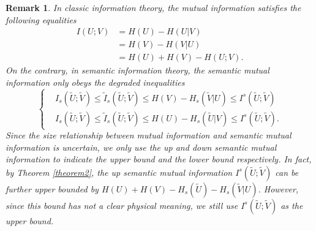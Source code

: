 \documentclass[12pt, draftclsnofoot,onecolumn]{IEEEtran}
\newtheorem{remark}{\bf{Remark}}
\begin{document}
\begin{remark}
In classic information theory, the mutual information satisfies the following equalities
\begin{equation}
\begin{aligned}
I(U;V)&=H(U)-H(U|V)\\
         &=H(V)-H(V|U)\\
         &=H(U)+H(V)-H(U;V).
\end{aligned}
\end{equation}
On the contrary, in semantic information theory, the semantic mutual information only obeys the degraded inequalities
\begin{equation}
\left\{\begin{aligned}
&I_s (\tilde{U};\tilde{V}) \leq \tilde{I}_s (\tilde{U};\tilde{V} ) \leq H(V)-H_s(\tilde{V}\left|U\right.) \leq I^s (\tilde{U};\tilde{V})\\
&I_s (\tilde{U};\tilde{V} ) \leq \tilde{I}_s (\tilde{U};\tilde{V}) \leq H(U)-H_s(\tilde{U}\left|V\right.) \leq I^s (\tilde{U};\tilde{V}).
\end{aligned}\right.
\end{equation}
Since the size relationship between mutual information and semantic mutual information is uncertain, we only use the up and down semantic mutual information to indicate the upper bound and the lower bound respectively. In fact, by Theorem \ref{theorem2}, the up semantic mutual information $I^s(\tilde{U};\tilde{V})$ can be further upper bounded by $H(U)+H(V)-H_s(\tilde{U})-H_s(\tilde{V}\left|U\right.)$. However, since this bound has not a clear physical meaning, we still use $I^s(\tilde{U};\tilde{V})$ as the upper bound.
\end{remark}
\end{document}
